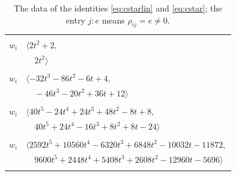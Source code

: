\documentclass[11pt]{article}
\begin{document}
\begingroup\scriptsize
\setlength{\LTcapwidth}{\textwidth}
\begin{longtable}{@{}ll@{}}
\caption{The data of the identities \eqref{eq:cstarlin} and \eqref{eq:cstar}; the entry $j{:}e$ means $\rho_{ij}=e\neq0$.}\label{tab:cstar}\\
\hline\endfirsthead\hline\endhead\hline\endfoot
\multicolumn{2}{@{}p{0.97\textwidth}@{}}{$i=0$, $D_i=2$, $\rho_{ij}$: $4{:}1, \allowbreak 5{:}2, \allowbreak 14{:}1, \allowbreak 21{:}1, \allowbreak 24{:}1, \allowbreak 34{:}1$}\\
$w_i$ & $\langle 2t^{2}+2,$\\
 & $\quad 2t^{2}\rangle$\\
\addlinespace[2pt]
\multicolumn{2}{@{}p{0.97\textwidth}@{}}{$i=1$, $D_i=4$, $\rho_{ij}$: $3{:}1, \allowbreak 5{:}1, \allowbreak 11{:}2, \allowbreak 12{:}1, \allowbreak 13{:}2, \allowbreak 15{:}1, \allowbreak 22{:}1, \allowbreak 38{:}2, \allowbreak 39{:}2$}\\
$w_i$ & $\langle -32t^{3}-86t^{2}-6t+4,$\\
 & $\quad -46t^{3}-20t^{2}+36t+12\rangle$\\
\addlinespace[2pt]
\multicolumn{2}{@{}p{0.97\textwidth}@{}}{$i=2$, $D_i=4$, $\rho_{ij}$: $6{:}2, \allowbreak 7{:}2, \allowbreak 11{:}1, \allowbreak 13{:}1, \allowbreak 14{:}1, \allowbreak 16{:}2, \allowbreak 24{:}2, \allowbreak 34{:}2, \allowbreak 37{:}2, \allowbreak 38{:}2, \allowbreak 39{:}1$}\\
$w_i$ & $\langle 40t^{5}-24t^{4}+24t^{3}+48t^{2}-8t+8,$\\
 & $\quad 40t^{5}+24t^{4}-16t^{3}+8t^{2}+8t-24\rangle$\\
\addlinespace[2pt]
\multicolumn{2}{@{}p{0.97\textwidth}@{}}{$i=3$, $D_i=16$, $\rho_{ij}$: $1{:}2, \allowbreak 4{:}2, \allowbreak 5{:}1, \allowbreak 7{:}2, \allowbreak 10{:}2, \allowbreak 11{:}1, \allowbreak 12{:}2, \allowbreak 16{:}2, \allowbreak 17{:}2, \allowbreak 18{:}2, \allowbreak 28{:}2, \allowbreak 29{:}2, \allowbreak 31{:}1, \allowbreak 32{:}2, \allowbreak 37{:}2, \allowbreak 38{:}1, \allowbreak 39{:}2$}\\
$w_i$ & $\langle 2592t^{5}+10560t^{4}-6320t^{3}+6848t^{2}-10032t-11872,$\\
 & $\quad 9600t^{5}+2448t^{4}+5408t^{3}+2608t^{2}-12960t-5696\rangle$\\
\addlinespace[2pt]
\multicolumn{2}{@{}p{0.97\textwidth}@{}}{$i=4$, $D_i=4$, $\rho_{ij}$: $0{:}2, \allowbreak 3{:}1, \allowbreak 7{:}1, \allowbreak 10{:}2, \allowbreak 11{:}2, \allowbreak 15{:}2, \allowbreak 29{:}2, \allowbreak 30{:}2$}\\

\end{longtable}
\end{document}
